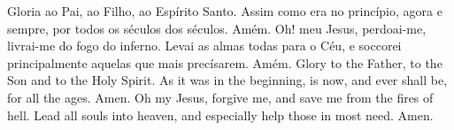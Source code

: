   \beginverse
    \parspace
    Gloria ao Pai, ao Filho, ao Espírito Santo.
    Assim como era no princípio, agora e sempre,
    por todos os séculos dos séculos.
    \parspace
    Amém.
    \parspace\parspace
    Oh! meu Jesus, perdoai-me, livrai-me do fogo do inferno.
    Levai as almas todas para o Céu,
    e soccorei principalmente aquelas que mais precísarem.
    \parspace
    Amém.
  \endverse
  \beginverse
    Glory to the Father, to the Son and to the Holy Spirit.
    As it was in the beginning, is now, and ever shall be,
    for all the ages.
    \parspace
    Amen.
    \parspace\parspace
    Oh my Jesus, forgive me, and save me from the fires of hell.
    Lead all souls into heaven,
    and especially help those in most need.
    \parspace
    Amen.
  \endverse
\endsong

